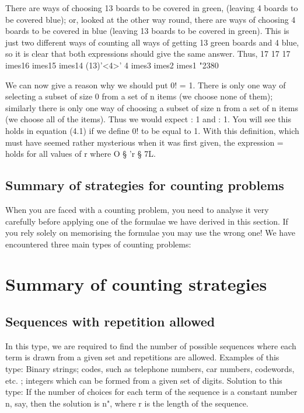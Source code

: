 \documentclass{beamer}
\begin{document}
{%
There are  ways of choosing 13 boards to be covered in green,
(leaving 4 boards to be covered blue); or, looked at the other way
round, there are  ways of choosing 4 boards to be covered in blue
(leaving 13 boards to be covered in green). This is just two different
ways of counting all ways of getting 13 green boards and 4 blue, so
it is clear that both expressions should give the same answer. Thus,
17 17 17	imes16	imes15	imes14
(13)'<4>' 4	imes3	imes2	imes1 "2380

We can now give a reason why we should put 0! = 1. There is only
one way of selecting a subset of size 0 from a set of n items (we
choose none of them); similarly there is only one way of choosing a
subset of size n from a set of n items (we choose all of the items).
Thus we would expect  : 1 and  : 1. You will see this holds in
equation (4.1) if we deﬁne 0! to be equal to 1. With this deﬁnition,
which must have seemed rather mysterious when it was ﬁrst given,
the expression  =  holds for all values of r where
O § 'r § 7L.

\subsection{Summary of strategies for counting problems}
When you are faced with a counting problem, you need to analyse it
very carefully before applying one of the formulae we have derived
in this section. If you rely solely on memorising the formulae you
may use the wrong one! We have encountered three main types of
counting problems:


\section{Summary of counting strategies}
\subsection{Sequences with repetition allowed}

In this type, we are required to find the number of possible sequences where
each term is drawn from a given set and repetitions are allowed.
Examples of this type: Binary strings; codes, such as telephone
numbers, car numbers, codewords, etc. ; integers which can be
formed from a given set of digits.
Solution to this type: If the number of choices for each term of the
sequence is a constant number n, say, then the solution is n",
where r is the length of the sequence.

}
\end{document}
